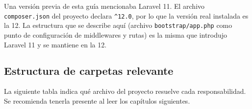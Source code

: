 \begin{nota}
Una versión previa de esta guía mencionaba Laravel 11. El archivo \texttt{composer.json} del proyecto declara \texttt{\^{}12.0}, por lo que la versión real instalada es la 12. La estructura que se describe aquí (archivo \texttt{bootstrap/app.php} como punto de configuración de middlewares y rutas) es la misma que introdujo Laravel 11 y se mantiene en la 12.
\end{nota}

\subsection{Estructura de carpetas relevante}
La siguiente tabla indica qué archivo del proyecto resuelve cada responsabilidad. Se recomienda tenerla presente al leer los capítulos siguientes.

